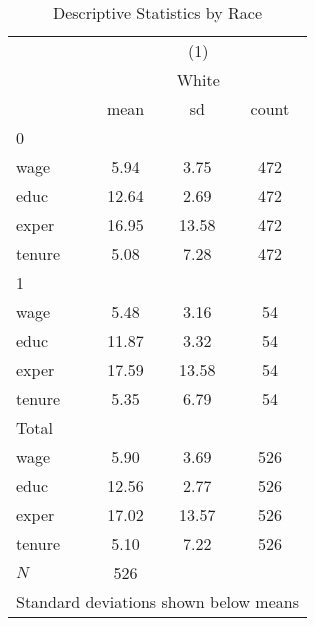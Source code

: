 \begin{table}[htbp]\centering
\def\sym#1{\ifmmode^{#1}\else\(^{#1}\)\fi}
\caption{Descriptive Statistics by Race}\label{tab:0201-descriptives_by_race}
\begin{tabular}{l*{1}{ccc}}
\toprule
            &\multicolumn{3}{c}{(1)}               \\
            &\multicolumn{3}{c}{White}             \\
            &        mean&          sd&       count\\
\midrule
0           &            &            &            \\
wage        &        5.94&        3.75&         472\\
educ        &       12.64&        2.69&         472\\
exper       &       16.95&       13.58&         472\\
tenure      &        5.08&        7.28&         472\\
\midrule
1           &            &            &            \\
wage        &        5.48&        3.16&          54\\
educ        &       11.87&        3.32&          54\\
exper       &       17.59&       13.58&          54\\
tenure      &        5.35&        6.79&          54\\
\midrule
Total       &            &            &            \\
wage        &        5.90&        3.69&         526\\
educ        &       12.56&        2.77&         526\\
exper       &       17.02&       13.57&         526\\
tenure      &        5.10&        7.22&         526\\
\midrule
\(N\)       &         526&            &            \\
\bottomrule
\multicolumn{4}{l}{\footnotesize Standard deviations shown below means}\\
\end{tabular}
\end{table}

